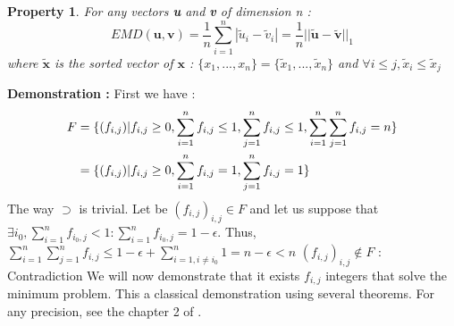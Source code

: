\documentclass{article}
\begin{document}
	\newtheorem{property}{Property}
	\begin{property}
	For any vectors \textbf{u} and \textbf{v} of dimension n :
	\begin{equation*}	
	EMD(\textbf{u},\textbf{v}) = \frac{1}{n} \sum_{i=1}^n |\tilde{u}_i - \tilde{v}_i| =  \frac{1}{n}||\tilde{\textbf{u}}-\tilde{\textbf{v}}||_1
	\end{equation*}
	where $\tilde{\textbf{x}}$ is the sorted vector of $\textbf{x}$ :
	\newline
	$\{x_1,...,x_n\}=\{\tilde{x}_1,...,\tilde{x}_n\}$ and $\forall i \leq j, \tilde{x}_i \leq \tilde{x}_j$\newline
	\end{property}



	\textbf{Demonstration :}\newline
	\newline
	First we have :
	\begin{multline*}
	\begin{split}
	F	&= \{(f_{i,j})| f_{i,j}\geq 0,\sum\limits_{i=1}^n f_{i,j} \leq 1, \sum\limits_{j=1}^n f_{i,j} \leq 1, \sum\limits_{i=1}^n \sum\limits_{j=1}^n f_{i,j} = n\} \newline \\
		&= \{(f_{i,j})| f_{i,j}\geq 0,\sum\limits_{i=1}^n f_{i,j} = 1, \sum\limits_{j=1}^n f_{i,j} = 1 \}
	\end{split}
	\end{multline*}
	The way $\supset$ is trivial.\newline
	\newline
	Let be $(f_{i,j})_{i,j} \in F$ and let us suppose that $\exists i_0, \sum\limits_{i=1}^n f_{i_0,j} < 1 : \sum\limits_{i=1}^n f_{i_0,j} = 1-\epsilon $.\newline
	Thus, $\sum\limits_{i=1}^n \sum\limits_{j=1}^n f_{i,j} \leq 1-\epsilon +\sum\limits_{i=1,i\neq i_0}^n 1= n-\epsilon < n $\newline
	$(f_{i,j})_{i,j} \notin F$ : Contradiction \newline
	\newline
	We will now demonstrate that it exists $f_{i,j}$ integers that solve the minimum problem. This a classical demonstration using several theorems. For any precision, see the chapter 2 of \cite{gaubert}.\newline
	
\end{document}
